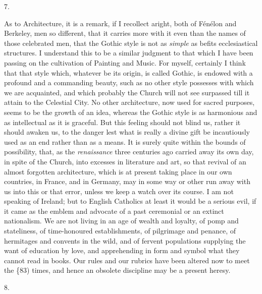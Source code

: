 7.

As to Architecture, it is a remark, if I recollect aright, both of
Fénélon and Berkeley, men so different, that it carries more
with it even than the names of those celebrated men, that the Gothic
style is not as \emph{simple} as befits ecclesiastical structures. I
understand this to be a similar judgment to that which I have been
passing on the cultivation of Painting and Music. For myself,
certainly I think that that style which, whatever be its origin, is
called Gothic, is endowed with a profound and a commanding beauty,
such as no other style possesses with which we are acquainted, and
which probably the Church will not see surpassed till it attain to the
Celestial City. No other architecture, now used for sacred purposes,
seems to be the growth of an idea, whereas the Gothic style is as
harmonious and as intellectual as it is graceful. But this feeling
should not blind us, rather it should awaken us, to the danger lest
what is really a divine gift be incautiously used as an end rather
than as a means. It is surely quite within the bounds of possibility,
that, as the \emph{renaissance} three centuries ago carried away its
own day, in spite of the Church, into excesses in literature and art,
so that revival of an almost forgotten architecture, which is at
present taking place in our own countries, in France, and in Germany,
may in some way or other run away with us into this or that error,
unless we keep a watch over its course. I am not speaking of Ireland;
but to English Catholics at least it would be a serious evil, if it
came as the emblem and advocate of a past ceremonial or an extinct
nationalism. We are not living in an age of wealth and loyalty, of
pomp and stateliness, of time-honoured establishments, of pilgrimage
and penance, of hermitages and convents in the wild, and of fervent
populations supplying the want of education by love, and apprehending
in form and symbol what they cannot read in books. Our rules and our
rubrics have been altered now to meet the \{83) times, and hence an
obsolete discipline may be a present heresy.

8.

